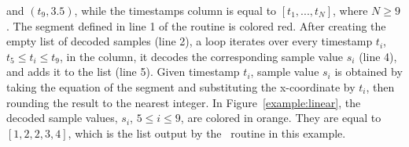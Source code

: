 \vspace{-21pt}
\begin{table}[h]
\begin{minipage}{0.45\textwidth}
and $(t_9,3.5)$, while the timestamps column is equal to $[t_1,...,t_N]$, where $N \geq 9$. The segment defined in line 1 of the routine is colored red. After creating the empty list of decoded samples (line 2), a loop iterates over every timestamp $t_i$, $t_5 \leq t_i \leq t_9$, in the column, it decodes the corresponding sample value $s_i$ (line 4), and adds it to the list (line 5). Given timestamp $t_i$, sample value $s_i$ is obtained by taking the equation of the segment and substituting the x-coordinate by $t_i$, then rounding the result to the nearest integer. In Figure~\ref{example:linear}, the decoded sample values, $s_i$, $5 \leq i \leq 9$, are colored in orange. They are equal to $[1, 2, 2, 3, 4]$, which is the list output by the \decodeSegment\ routine in this example.
\end{minipage}
\hspace{0.02\textwidth}
\begin{minipage}{0.49\textwidth}
\examplelinear
\end{minipage}
\end{table}

